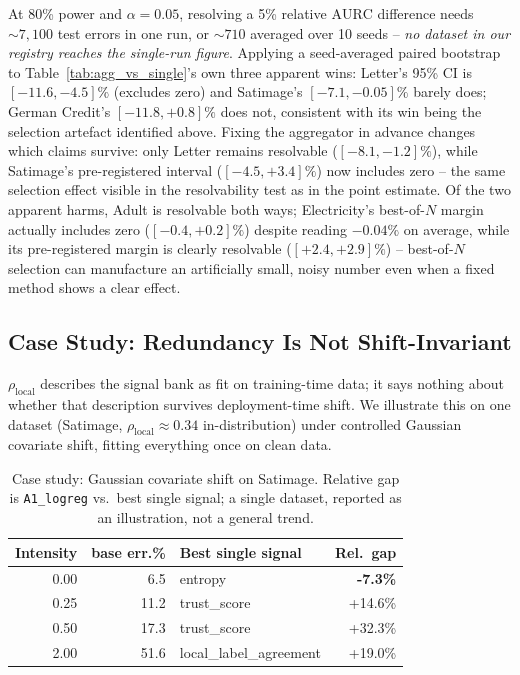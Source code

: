\documentclass[conference]{IEEEtran}
\newcommand{\aurc}{\mathrm{AURC}}
\newcommand{\rholocal}{\rho_{\mathrm{local}}}
\begin{document}
At 80\% power and $\alpha{=}0.05$, resolving a 5\% relative $\aurc$ difference needs ${\sim}7{,}100$ test errors in one run, or ${\sim}710$ averaged over 10 seeds -- \emph{no dataset in our registry reaches the single-run figure}. Applying a seed-averaged paired bootstrap to Table~\ref{tab:agg_vs_single}'s own three apparent wins: Letter's 95\% CI is $[-11.6,-4.5]\%$ (excludes zero) and Satimage's $[-7.1,-0.05]\%$ barely does; German Credit's $[-11.8,+0.8]\%$ does not, consistent with its win being the selection artefact identified above. Fixing the aggregator in advance changes which claims survive: only Letter remains resolvable ($[-8.1,-1.2]\%$), while Satimage's pre-registered interval ($[-4.5,+3.4]\%$) now includes zero -- the same selection effect visible in the resolvability test as in the point estimate. Of the two apparent harms, Adult is resolvable both ways; Electricity's best-of-$N$ margin actually includes zero ($[-0.4,+0.2]\%$) despite reading $-0.04\%$ on average, while its pre-registered margin is clearly resolvable ($[+2.4,+2.9]\%$) -- best-of-$N$ selection can manufacture an artificially small, noisy number even when a fixed method shows a clear effect.

\subsection{Case Study: Redundancy Is Not Shift-Invariant}
\label{sec:rq2}

$\rholocal$ describes the signal bank as fit on training-time data; it says nothing about whether that description survives deployment-time shift. We illustrate this on one dataset (Satimage, $\rholocal{\approx}0.34$ in-distribution) under controlled Gaussian covariate shift, fitting everything once on clean data.

\begin{table}[t]
\centering
\caption{Case study: Gaussian covariate shift on Satimage. Relative gap is \texttt{A1\_logreg} vs.\ best single signal; a single dataset, reported as an illustration, not a general trend.}
\label{tab:shift}
\begin{tabular}{r r l r}
\toprule
Intensity & base err.\% & Best single signal & Rel.\ gap \\
\midrule
0.00 & 6.5 & entropy & \textbf{-7.3\%} \\
0.25 & 11.2 & trust\_score & +14.6\% \\
0.50 & 17.3 & trust\_score & +32.3\% \\
2.00 & 51.6 & local\_label\_agreement & +19.0\% \\
\bottomrule
\end{tabular}
\end{table}
\end{document}
